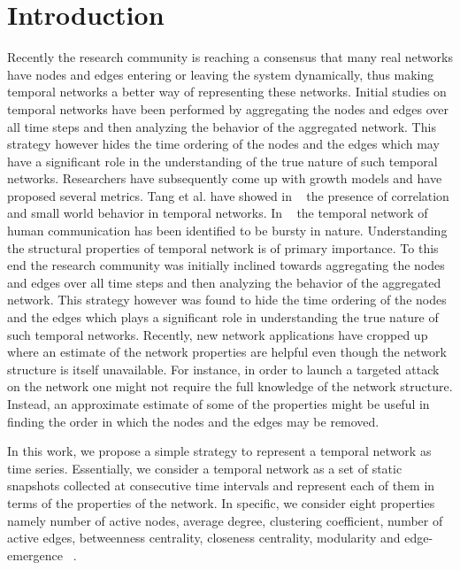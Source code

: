 \noindent
\section{Introduction}
\label{introduction}
Recently the research community is reaching a consensus that many real 
networks have nodes and edges entering or leaving the system dynamically, thus making temporal networks a better way of representing these networks. 
Initial studies on temporal networks have been performed by aggregating the nodes and edges over all time 
steps and then analyzing the behavior of the aggregated network. This strategy however hides the time ordering of the nodes and the edges 
which may have a significant role in the understanding of 
the true nature of such temporal networks.
Researchers have subsequently come up with growth models and have proposed several metrics. Tang et al. have showed in ~\cite{TSMML10:smallworld} 
the presence of correlation and small world 
behavior in temporal networks. In ~\cite{stehle2010dynamical} the temporal network of human communication has been identified to be bursty in nature.
\fi
Understanding the structural properties of temporal network is of primary importance. To this end the research community was initially inclined towards 
aggregating the nodes and edges over all time 
steps and then analyzing the behavior of the aggregated network. This strategy however was found to hide the time ordering of the nodes and the edges 
which plays a significant role in understanding  
the true nature of such temporal networks. 
Recently, new network applications have cropped up where an estimate of the network properties are helpful even though the network structure is itself unavailable. 
For instance, in order to launch a targeted attack on the network one might not require the full knowledge of the network structure. Instead, an approximate estimate of some 
of the properties might be useful in finding the order in which the nodes and the edges may be removed. 

In this work, 
we propose a simple strategy to represent a temporal network as time series. Essentially, we consider a temporal network as a set of static snapshots collected 
at consecutive time intervals and represent each of them in terms of the properties of the network. In specific, we consider eight properties namely number of 
active nodes, average degree, clustering coefficient, number of active edges, betweenness centrality, closeness 
centrality, modularity and edge-emergence ~\cite{sur2014attack}. 

